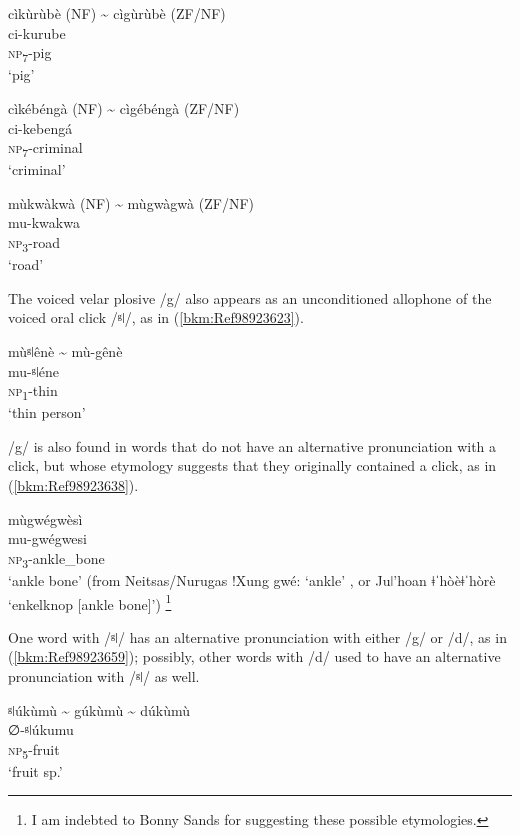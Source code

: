 \ea
\label{bkm:Ref97911315}
cìkùrùbè (NF) {\textasciitilde} cìgùrùbè (ZF/NF)\\
\gll ci-kurube\\
\textsc{np}\textsubscript{7}-pig\\
\glt ‘pig’
\z

\ea
cìkébéngà (NF) {\textasciitilde} cìgébéngà (ZF/NF)\\
\gll ci-kebengá\\
\textsc{np}\textsubscript{7}-criminal\\
\glt ‘criminal’
\z

\ea
\label{bkm:Ref97911319}
mùkwàkwà (NF) {\textasciitilde} mùgwàgwà (ZF/NF)\\
\gll mu-kwakwa\\
\textsc{np}\textsubscript{3}-road\\
\glt ‘road’
\z

The voiced velar plosive /g/ also appears as an unconditioned allophone of the voiced oral click /ᵍǀ/, as in (\ref{bkm:Ref98923623}).

\ea
\label{bkm:Ref98923623}
\glll mùᵍǀênè {\textasciitilde} mù-gênè\\
mu-ᵍǀéne\\
\textsc{np}\textsubscript{1}-thin\\
\glt ‘thin person’
\z

/g/ is also found in words that do not have an alternative pronunciation with a click, but whose etymology suggests that they originally contained a click, as in (\ref{bkm:Ref98923638}).

\ea
\label{bkm:Ref98923638}
\glll mùgwégwèsì\\
mu-gwégwesi\\
\textsc{np}\textsubscript{3}-ankle\_bone\\
\glt ‘ankle bone’ (from Neitsas/Nurugas !Xung gwé: ‘ankle’ \citep{Doke1925}, or Juǀ’hoan ǂˈhòèǂˈhòrè ‘enkelknop [ankle bone]’) \citep[107]{Snyman1975}\footnote{I am indebted to Bonny Sands for suggesting these possible etymologies.}
\z

One word with /ᵍǀ/ has an alternative pronunciation with either /g/ or /d/, as in (\ref{bkm:Ref98923659}); possibly, other words with /d/ used to have an alternative pronunciation with /ᵍǀ/ as well.

\ea
\label{bkm:Ref98923659}
ᵍǀúkùmù {\textasciitilde} gúkùmù {\textasciitilde} dúkùmù\\
\gll ∅-ᵍǀúkumu\\
\textsc{np}\textsubscript{5}-fruit\\
\glt ‘fruit sp.’
\z
